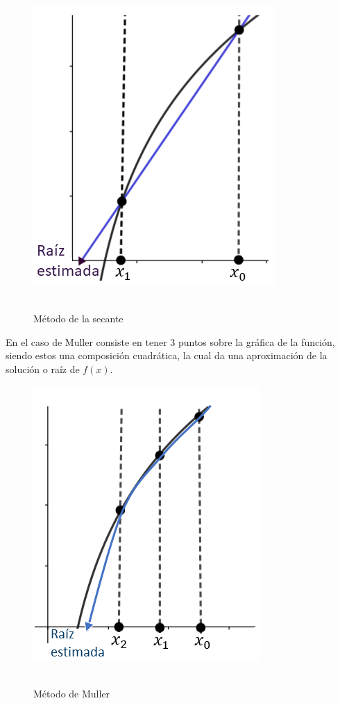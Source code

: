 \documentclass[ceqn,10pt]{SelfArx}
\begin{document}
\begin{figure}[ht]\centering
	\includegraphics[scale=0.5]{GrafSecante.png}\\\ 
	\caption{Método de la secante}
	\label{fig:secante}
\end{figure}
En el caso de 
Muller consiste en tener 3 puntos sobre la gráfica de la función, 
siendo estos una composición cuadrática, la cual da una aproximación de la solución o raíz de $f(x)$.
\begin{figure}[ht]\centering
	\includegraphics[scale=0.5]{GrafMuller.png}\\\
	
	\caption{Método de Muller}
	\label{fig:muller}
\end{figure}
\end{document}
